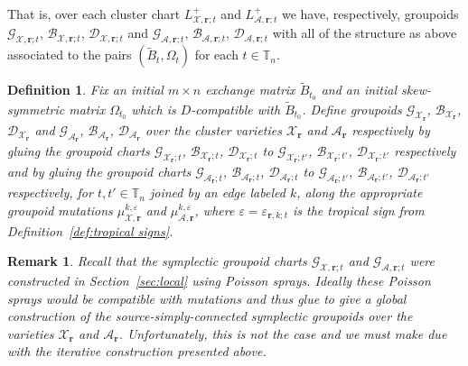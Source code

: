 \documentclass{amsart}
\newtheorem{definition}[theorem]{Definition}
\newtheorem{remark}[theorem]{Remark}
\numberwithin{equation}{section}
\newcommand{\bfr}{{\boldsymbol{r}}}
\newcommand{\cA}{\mathcal{A}}
\newcommand{\cB}{\mathcal{B}}
\newcommand{\cD}{\mathcal{D}}
\newcommand{\cG}{\mathcal{G}}
\newcommand{\cX}{\mathcal{X}}
\newcommand{\TT}{\mathbb{T}}
\begin{document}
That is, over each cluster chart $L^+_{\cX,\bfr;t}$ and $L^+_{\cA,\bfr;t}$ we have, respectively, groupoids $\cG_{\cX,\bfr;t}$, $\cB_{\cX,\bfr;t}$, $\cD_{\cX,\bfr;t}$ and $\cG_{\cA,\bfr;t}$, $\cB_{\cA,\bfr;t}$, $\cD_{\cA,\bfr;t}$ with all of the structure as above associated to the pairs $(\tilde B_t,\Omega_t)$ for each $t\in\TT_n$.
\begin{definition}
  Fix an initial $m\times n$ exchange matrix $\tilde B_{t_0}$ and an initial skew-symmetric matrix $\Omega_{t_0}$ which is $D$-compatible with $\tilde B_{t_0}$.
  Define groupoids $\cG_{\cX_\bfr}$, $\cB_{\cX_\bfr}$, $\cD_{\cX_\bfr}$ and $\cG_{\cA_\bfr}$, $\cB_{\cA_\bfr}$, $\cD_{\cA_\bfr}$ over the cluster varieties $\cX_\bfr$ and $\cA_\bfr$ respectively by gluing the groupoid charts $\cG_{\cX_\bfr;t}$, $\cB_{\cX_\bfr;t}$, $\cD_{\cX_\bfr;t}$ to $\cG_{\cX_\bfr;t'}$, $\cB_{\cX_\bfr;t'}$, $\cD_{\cX_\bfr;t'}$ respectively and by gluing the groupoid charts $\cG_{\cA_\bfr;t}$, $\cB_{\cA_\bfr;t}$, $\cD_{\cA_\bfr;t}$ to $\cG_{\cA_\bfr;t'}$, $\cB_{\cA_\bfr;t'}$, $\cD_{\cA_\bfr;t'}$ respectively, for $t,t'\in\TT_n$ joined by an edge labeled $k$, along the appropriate groupoid mutations $\mu_{\cX,\bfr}^{k,\varepsilon}$ and $\mu_{\cA,\bfr}^{k,\varepsilon}$, where $\varepsilon=\varepsilon_{\bfr,k;t}$ is the tropical sign from Definition~\ref{def:tropical signs}.
\end{definition}
\begin{remark}
  Recall that the symplectic groupoid charts $\cG_{\cX,\bfr;t}$ and $\cG_{\cA,\bfr;t}$ were constructed in Section~\ref{sec:local} using Poisson sprays.
  Ideally these Poisson sprays would be compatible with mutations and thus glue to give a global construction of the source-simply-connected symplectic groupoids over the varieties $\cX_\bfr$ and $\cA_\bfr$.
  Unfortunately, this is not the case and we must make due with the iterative construction presented above.
\end{remark}
\end{document}
